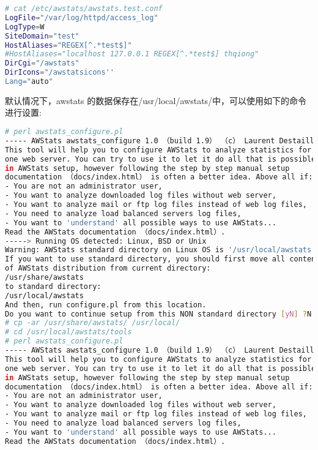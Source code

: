 \begin{lstlisting}[language=bash]
# cat /etc/awstats/awstats.test.conf
LogFile="/var/log/httpd/access_log"
LogType=W
SiteDomain="test"
HostAliases="REGEX[^.*test$]"
#HostAliases="localhost 127.0.0.1 REGEX[^.*test$] thqiong"
DirCgi="/awstats"
DirIcons="/awstatsicons''
Lang="auto"
\end{lstlisting}


默认情况下，awstats 的数据保存在/usr/local/awstats/中，可以使用如下的命令进行设置:



\begin{lstlisting}[language=bash]
# perl awstats_configure.pl
----- AWStats awstats_configure 1.0 （build 1.9） （c） Laurent Destailleur -----
This tool will help you to configure AWStats to analyze statistics for
one web server. You can try to use it to let it do all that is possible
in AWStats setup, however following the step by step manual setup
documentation （docs/index.html） is often a better idea. Above all if:
- You are not an administrator user,
- You want to analyze downloaded log files without web server,
- You want to analyze mail or ftp log files instead of web log files,
- You need to analyze load balanced servers log files,
- You want to 'understand' all possible ways to use AWStats...
Read the AWStats documentation （docs/index.html）.
-----> Running OS detected: Linux, BSD or Unix
Warning: AWStats standard directory on Linux OS is '/usr/local/awstats'.
If you want to use standard directory, you should first move all content
of AWStats distribution from current directory:
/usr/share/awstats
to standard directory:
/usr/local/awstats
And then, run configure.pl from this location.
Do you want to continue setup from this NON standard directory [yN] ?N
# cp -ar /usr/share/awstats/ /usr/local/
# cd /usr/local/awstats/tools
# perl awstats_configure.pl
----- AWStats awstats_configure 1.0 （build 1.9） （c） Laurent Destailleur -----
This tool will help you to configure AWStats to analyze statistics for
one web server. You can try to use it to let it do all that is possible
in AWStats setup, however following the step by step manual setup
documentation （docs/index.html） is often a better idea. Above all if:
- You are not an administrator user,
- You want to analyze downloaded log files without web server,
- You want to analyze mail or ftp log files instead of web log files,
- You need to analyze load balanced servers log files,
- You want to 'understand' all possible ways to use AWStats...
Read the AWStats documentation （docs/index.html）.

\end{lstlisting}

